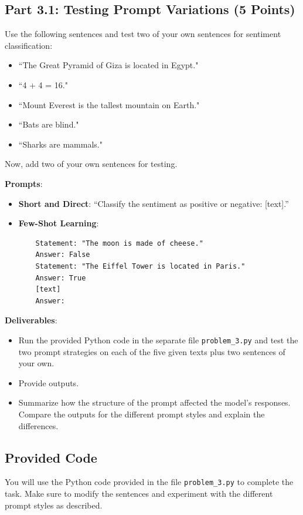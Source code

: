 \documentclass[11pt, oneside]{article}   	%
\begin{document}
\subsection*{Part 3.1: Testing Prompt Variations (5 Points)}

Use the following sentences and test two of your own sentences for sentiment classification:

\begin{itemize}
    \item ``The Great Pyramid of Giza is located in Egypt."
    \item ``4 + 4 = 16."
    \item ``Mount Everest is the tallest mountain on Earth."
    \item ``Bats are blind."
    \item ``Sharks are mammals."
\end{itemize}

Now, add two of your own sentences for testing.

\textbf{Prompts}:
\begin{itemize}
    \item \textbf{Short and Direct}: “Classify the sentiment as positive or negative: [text].”
    \item \textbf{Few-Shot Learning}: 
    \begin{verbatim}
    Statement: "The moon is made of cheese."
    Answer: False
    Statement: "The Eiffel Tower is located in Paris."
    Answer: True
    [text] 
    Answer:
    \end{verbatim}
\end{itemize}

\textbf{Deliverables}:
\begin{itemize}
    \item Run the provided Python code in the separate file \texttt{problem\_3.py} and test the two prompt strategies on each of the five given texts plus two sentences of your own.
    \item Provide outputs.
    \item Summarize how the structure of the prompt affected the model’s responses. Compare the outputs for the different prompt styles and explain the differences.
\end{itemize}

\subsection*{Provided Code}
You will use the Python code provided in the file \texttt{problem\_3.py} to complete the task. Make sure to modify the sentences and experiment with the different prompt styles as described.
\end{document}
